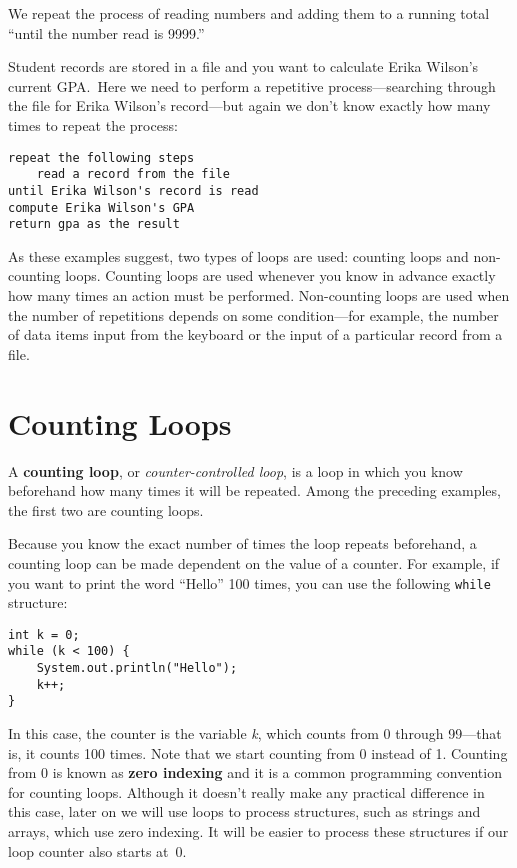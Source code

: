 \begin{BL}
\noindent We repeat the process of reading numbers and
adding them to a running total ``until the number read is 9999.''

\item  Student records are stored in a file and you want to
calculate Erika Wilson's current GPA.~Here we need to perform a
repetitive process---searching through the file for Erika Wilson's
record---but again we don't know exactly how many times to repeat
the process:

\begin{jjjlisting}
\begin{lstlisting}[stringstyle=\color{black}]
repeat the following steps
    read a record from the file
until Erika Wilson's record is read
compute Erika Wilson's GPA
return gpa as the result
\end{lstlisting}
\end{jjjlisting}
\end{BL}

\noindent As these examples suggest, two types of loops are used:
counting loops and non-counting loops.  Counting loops are used
whenever you know in advance exactly how many times an action must be
performed.  Non-counting loops are used when the number of repetitions
depends on some condition---for example, the number of data items
input from the keyboard or the input of a particular record from a
file.

\section{Counting Loops}
\noindent A {\bf counting loop}, or {\it counter-controlled loop}, is
a loop in which you know beforehand how many times it will be
repeated. Among the preceding examples, the first two are counting
loops.

Because you know the exact number of times the loop repeats 
 beforehand, a counting loop can be made dependent on the value of a
counter. For example, if you want to print the word ``Hello'' 100
times, you can use the following {\tt while}  structure:

\begin{jjjlisting}
\begin{lstlisting}
int k = 0;
while (k < 100) {
    System.out.println("Hello");
    k++;
}
\end{lstlisting}
\end{jjjlisting}

\noindent In this case, the counter is the variable {\it k}, which counts
from 0 through 99---that is, it counts 100 times.  Note that we start
counting from 0 instead of 1. Counting from 0 is known as {\bf zero
indexing} and it is a common programming convention for counting
loops.  Although it doesn't really make any practical difference in
this case, later on we will use loops to process
structures, such as strings and arrays, which use zero indexing. It
will be easier to process these structures if our loop counter also
starts at~0.

